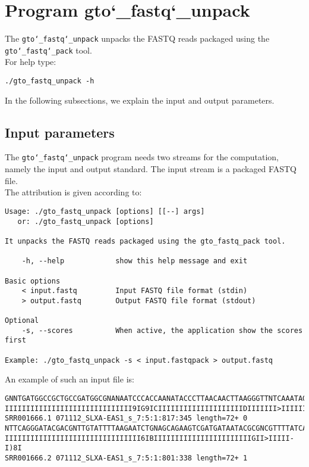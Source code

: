 \section{Program gto\char`_fastq\char`_unpack}
The \texttt{gto\char`_fastq\char`_unpack} unpacks the FASTQ reads packaged using the \texttt{gto\char`_fastq\char`_pack} tool.\\
For help type:
\begin{lstlisting}
./gto_fastq_unpack -h
\end{lstlisting}
In the following subsections, we explain the input and output parameters.

\subsection*{Input parameters}

The \texttt{gto\char`_fastq\char`_unpack} program needs two streams for the computation, namely the input and output standard. The input stream is a packaged FASTQ file.\\
The attribution is given according to:
\begin{lstlisting}
Usage: ./gto_fastq_unpack [options] [[--] args]
   or: ./gto_fastq_unpack [options]

It unpacks the FASTQ reads packaged using the gto_fastq_pack tool.

    -h, --help            show this help message and exit

Basic options
    < input.fastq         Input FASTQ file format (stdin)
    > output.fastq        Output FASTQ file format (stdout)

Optional
    -s, --scores          When active, the application show the scores first
    
Example: ./gto_fastq_unpack -s < input.fastqpack > output.fastq
\end{lstlisting}
An example of such an input file is:
\begin{lstlisting}
GNNTGATGGCCGCTGCCGATGGCGNANAATCCCACCAANATACCCTTAACAACTTAAGGGTTNTCAAATAGA
IIIIIIIIIIIIIIIIIIIIIIIIIIIIII9IG9ICIIIIIIIIIIIIIIIIIIIIDIIIIIII>IIIIII/
SRR001666.1 071112_SLXA-EAS1_s_7:5:1:817:345 length=72+	0
NTTCAGGGATACGACGNTTGTATTTTAAGAATCTGNAGCAGAAGTCGATGATAATACGCGNCGTTTTATCAN
IIIIIIIIIIIIIIIIIIIIIIIIIIIIIIII6IBIIIIIIIIIIIIIIIIIIIIIIIGII>IIIII-I)8I
SRR001666.2 071112_SLXA-EAS1_s_7:5:1:801:338 length=72+ 1
\end{lstlisting}

